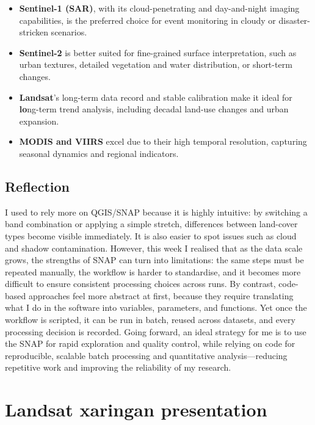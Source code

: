 \documentclass[
  letterpaper,
  DIV=11,
  numbers=noendperiod]{scrreprt}
\begin{document}
\begin{itemize}
\item
  \textbf{Sentinel-1 (SAR)}, with its cloud-penetrating and
  day-and-night imaging capabilities, is the preferred choice for event
  monitoring in cloudy or disaster-stricken scenarios.
\item
  \textbf{Sentinel-2} is better suited for fine-grained surface
  interpretation, such as urban textures, detailed vegetation and water
  distribution, or short-term changes.
\item
  \textbf{Landsat}'s long-term data record and stable calibration make
  it ideal for \textbf{lo}ng-term trend analysis, including decadal
  land-use changes and urban expansion.
\item
  \textbf{MODIS and VIIRS} excel due to their high temporal resolution,
  capturing seasonal dynamics and regional indicators.
\end{itemize}

\section{Reflection}\label{reflection}

I used to rely more on QGIS/SNAP because it is highly intuitive: by
switching a band combination or applying a simple stretch, differences
between land-cover types become visible immediately. It is also easier
to spot issues such as cloud and shadow contamination. However, this
week I realised that as the data scale grows, the strengths of SNAP can
turn into limitations: the same steps must be repeated manually, the
workflow is harder to standardise, and it becomes more difficult to
ensure consistent processing choices across runs. By contrast,
code-based approaches feel more abstract at first, because they require
translating what I do in the software into variables, parameters, and
functions. Yet once the workflow is scripted, it can be run in batch,
reused across datasets, and every processing decision is recorded. Going
forward, an ideal strategy for me is to use the SNAP for rapid
exploration and quality control, while relying on code for reproducible,
scalable batch processing and quantitative analysis---reducing
repetitive work and improving the reliability of my research.


\chapter{Landsat xaringan
presentation}\label{landsat-xaringan-presentation}
\end{document}
